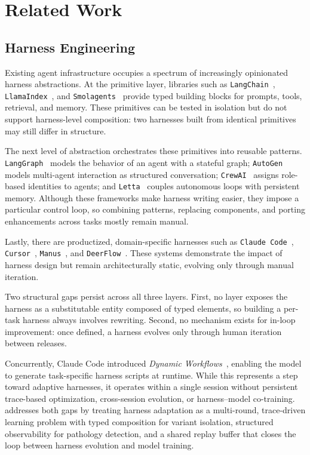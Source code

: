 \section{Related Work}
\label{sec:related}

\subsection{Harness Engineering}
\label{sec:related-harness-eng}

Existing agent infrastructure occupies a spectrum of increasingly opinionated harness abstractions. At the primitive layer, libraries such as \texttt{LangChain}~\cite{langchain}, \texttt{LlamaIndex}~\cite{Liu_LlamaIndex_2022}, and \texttt{Smolagents}~\cite{smolagents} provide typed building blocks for prompts, tools, retrieval, and memory. These primitives can be tested in isolation but do not support harness-level composition: two harnesses built from identical primitives may still differ in structure.

The next level of abstraction orchestrates these primitives into reusable patterns. \texttt{LangGraph}~\cite{langgraph} models the behavior of an agent with a stateful graph; \texttt{AutoGen}~\cite{wu2024autogen} models multi-agent interaction as structured conversation; \texttt{CrewAI}~\cite{moura2025crewai} assigns role-based identities to agents; and \texttt{Letta}~\cite{packer2023memgpt} couples autonomous loops with persistent memory. Although these frameworks make harness writing easier, they impose a particular control loop, so combining patterns, replacing components, and porting enhancements across tasks mostly remain manual.

Lastly, there are productized, domain-specific harnesses such as \texttt{Claude Code}~\cite{claudecode}, \texttt{Cursor}~\cite{cursor}, \texttt{Manus}~\cite{shen2025mind}, and \texttt{DeerFlow}~\cite{deerflow}. These systems demonstrate the impact of harness design but remain architecturally static, evolving only through manual iteration.

Two structural gaps persist across all three layers. First, no layer exposes the harness as a substitutable entity composed of typed elements, so building a per-task harness always involves rewriting. Second, no mechanism exists for in-loop improvement: once defined, a harness evolves only through human iteration between releases.

Concurrently, Claude Code introduced \textit{Dynamic Workflows}~\cite{anthropic2026dynamicworkflows}, enabling the model to generate task-specific harness scripts at runtime. While this represents a step toward adaptive harnesses, it operates within a single session without persistent trace-based optimization, cross-session evolution, or harness--model co-training. \ProjectName addresses both gaps by treating harness adaptation as a multi-round, trace-driven learning problem with typed composition for variant isolation, structured observability for pathology detection, and a shared replay buffer that closes the loop between harness evolution and model training.

